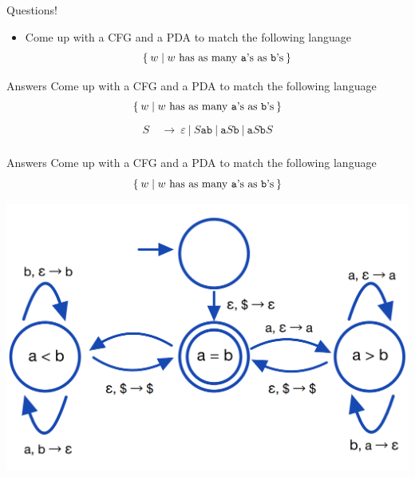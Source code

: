 \documentclass[aspectratio=169]{beamer}
\begin{document}
\begin{frame}{Questions!}

    \begin{itemize}
        \item Come up with a CFG and a PDA to match the following language 
        $$
            \Set{w | w \text{ has as many \texttt{a}'s as \texttt{b}'s}}
        $$
    \end{itemize}
    
\end{frame}

\begin{frame}{Answers}
    Come up with a CFG and a PDA to match the following language
    $$
        \Set{w | w \text{ has as many \texttt{a}'s as \texttt{b}'s}}
    $$
    {
    \Large
    \begin{align*}
        S ~&\to~ \varepsilon ~|~ S\texttt{a}\texttt{b} ~|~ \texttt{a}S\texttt{b} ~|~ \texttt{a}S\texttt{b}S  \\
    \end{align*}
    }
\end{frame}

\begin{frame}{Answers}
    Come up with a CFG and a PDA to match the following language
    $$
        \Set{w | w \text{ has as many \texttt{a}'s as \texttt{b}'s}}
    $$
    \begin{center}
        \includegraphics[scale=0.25]{images/wab.png}
    \end{center}
\end{frame}
\end{document}
